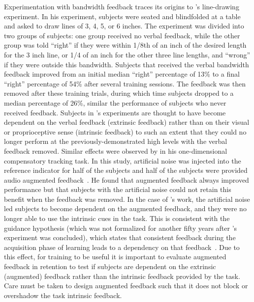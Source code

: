 Experimentation with bandwidth feedback traces its origins to \citeauthor{thorndike_law_1927}'s \citeyear{thorndike_law_1927} line-drawing experiment.
In his experiment, subjects were seated and blindfolded at a table and asked to draw lines of 3, 4, 5, or 6 inches.
The experiment was divided into two groups of subjects: one group received no verbal feedback, while the other group was told ``right'' if they were within 1/8th of an inch of the desired length for the 3 inch line, or 1/4 of an inch for the other three line lengths, and ``wrong'' if they were outside this bandwidth.
Subjects that received the verbal bandwidth feedback improved from an initial median ``right'' percentage of 13\% to a final ``right'' percentage of 54\% after several training sessions.
The feedback was then removed after these training trials, during which time subjects dropped to a median percentage of 26\%, similar the performance of subjects who never received feedback.
Subjects in \citeauthor{thorndike_law_1927}'s experiments are thought to have become dependent on the verbal feedback (extrinsic feedback) rather than on their visual or proprioceptive sense (intrinsic feedback) to such an extent that they could no longer perform at the previously-demonstrated high levels with the verbal feedback removed.
Similar effects were observed by \citeauthor{kinkade1963differential} in his one-dimensional compensatory tracking task.
In this study, artificial noise was injected into the reference indicator for half of the subjects and half of the subjects were provided audio augmented feedback~\citep{kinkade1963differential}.
He found that augmented feedback always improved performance but that subjects with the artificial noise could not retain this benefit when the feedback was removed.
In the case of \citeauthor{kinkade1963differential}'s work, the artificial noise led subjects to become dependent on the augmented feedback, and they were no longer able to use the intrinsic cues in the task.
This is consistent with the guidance hypothesis (which was not formalized for another fifty years after \citeauthor{thorndike_law_1927}'s experiment was concluded), which states that consistent feedback during the acquisition phase of learning leads to a dependency on that feedback~\citep{salmoni_knowledge_1984}.
Due to this effect, for training to be useful it is important to evaluate augmented feedback in retention to test if subjects are dependent on the extrinsic (augmented) feedback rather than the intrinsic feedback provided by the task.
Care must be taken to design augmented feedback such that it does not block or overshadow the task intrinsic feedback.

